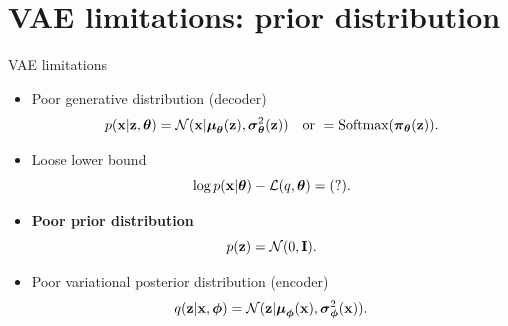 \section{VAE limitations: prior distribution}
\begin{frame}{VAE limitations}
	\begin{itemize}
		\item Poor generative distribution (decoder)
		\[
		p(\mathbf{x} | \mathbf{z}, \boldsymbol{\theta}) = \mathcal{N}(\mathbf{x}| \boldsymbol{\mu}_{\boldsymbol{\theta}}(\mathbf{z}), \boldsymbol{\sigma}^2_{\boldsymbol{\theta}}(\mathbf{z})) \quad \text{or } = \text{Softmax}(\boldsymbol{\pi}_{\boldsymbol{\theta}}(\mathbf{z})).
		\]
		\item Loose lower bound
		\[
		\log p(\mathbf{x} | \boldsymbol{\theta}) - \mathcal{L}(q, \boldsymbol{\theta}) = (?).
		\]
		\item \textbf{Poor prior distribution}
		\[
		p(\mathbf{z}) = \mathcal{N}(0, \mathbf{I}).
		\]
		\item Poor variational posterior distribution (encoder)
		\[
		q(\mathbf{z} | \mathbf{x}, \boldsymbol{\phi}) = \mathcal{N}(\mathbf{z}| \boldsymbol{\mu}_{\boldsymbol{\phi}}(\mathbf{x}), \boldsymbol{\sigma}^2_{\boldsymbol{\phi}}(\mathbf{x})).
		\]
	\end{itemize}
\end{frame}
